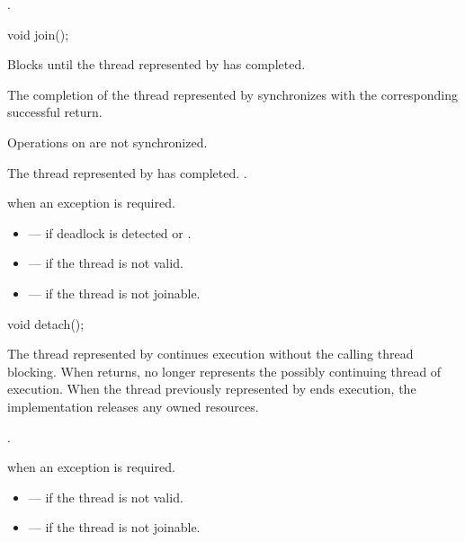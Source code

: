 \begin{itemdescr}
\pnum
\returns
{}.
\end{itemdescr}

%
\begin{itemdecl}
void join();
\end{itemdecl}

\begin{itemdescr}
\pnum
{}%
\effects
Blocks until the thread represented by  has completed.

\pnum
\sync
The completion of the thread represented by 
synchronizes with
the corresponding successful  return.
\begin{note}
Operations on  are not synchronized.
\end{note}

\pnum
\ensures
The thread represented by  has completed.
.

\pnum
\throws
{} when an exception is required.

\pnum
\errors
\begin{itemize}
\item {} --- if deadlock is detected or
.

\item {} --- if the thread is not valid.

\item {} --- if the thread is not joinable.
\end{itemize}
\end{itemdescr}

%
\begin{itemdecl}
void detach();
\end{itemdecl}

\begin{itemdescr}
\pnum
\effects
The thread represented by  continues execution
without the calling thread blocking.
When  returns,
 no longer represents the possibly continuing thread of execution.
When the thread previously represented by  ends execution,
the implementation releases any owned resources.

\pnum
\ensures
{}.

\pnum
\throws
{} when an exception is required.

\pnum
\errors
\begin{itemize}
\item {} --- if the thread is not valid.
\item {} --- if the thread is not joinable.
\end{itemize}
\end{itemdescr}

